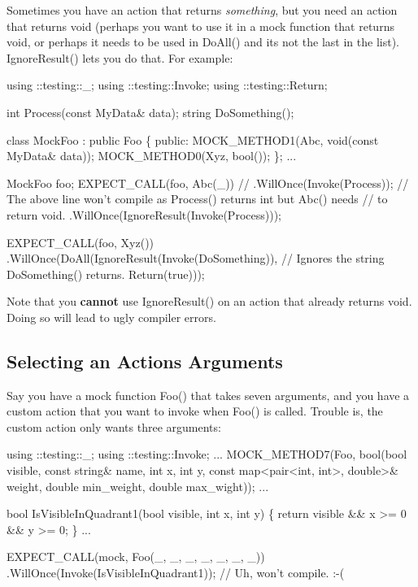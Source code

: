 Sometimes you have an action that returns {\itshape something}, but you need an action that returns {\ttfamily void} (perhaps you want to use it in a mock function that returns {\ttfamily void}, or perhaps it needs to be used in {\ttfamily Do\+All()} and it\textquotesingle{}s not the last in the list). {\ttfamily Ignore\+Result()} lets you do that. For example\+:


\begin{DoxyCode}
using ::testing::\_;
using ::testing::Invoke;
using ::testing::Return;

int Process(const MyData& data);
string DoSomething();

class MockFoo : public Foo \{
 public:
  MOCK\_METHOD1(Abc, void(const MyData& data));
  MOCK\_METHOD0(Xyz, bool());
\};
...

  MockFoo foo;
  EXPECT\_CALL(foo, Abc(\_))
  // .WillOnce(Invoke(Process));
  // The above line won't compile as Process() returns int but Abc() needs
  // to return void.
      .WillOnce(IgnoreResult(Invoke(Process)));

  EXPECT\_CALL(foo, Xyz())
      .WillOnce(DoAll(IgnoreResult(Invoke(DoSomething)),
      // Ignores the string DoSomething() returns.
                      Return(true)));
\end{DoxyCode}


Note that you {\bfseries cannot} use {\ttfamily Ignore\+Result()} on an action that already returns {\ttfamily void}. Doing so will lead to ugly compiler errors.

\subsection*{Selecting an Action\textquotesingle{}s Arguments}

Say you have a mock function {\ttfamily Foo()} that takes seven arguments, and you have a custom action that you want to invoke when {\ttfamily Foo()} is called. Trouble is, the custom action only wants three arguments\+:


\begin{DoxyCode}
using ::testing::\_;
using ::testing::Invoke;
...
  MOCK\_METHOD7(Foo, bool(bool visible, const string& name, int x, int y,
                         const map<pair<int, int>, double>& weight,
                         double min\_weight, double max\_wight));
...

bool IsVisibleInQuadrant1(bool visible, int x, int y) \{
  return visible && x >= 0 && y >= 0;
\}
...

  EXPECT\_CALL(mock, Foo(\_, \_, \_, \_, \_, \_, \_))
      .WillOnce(Invoke(IsVisibleInQuadrant1));  // Uh, won't compile. :-(
\end{DoxyCode}


